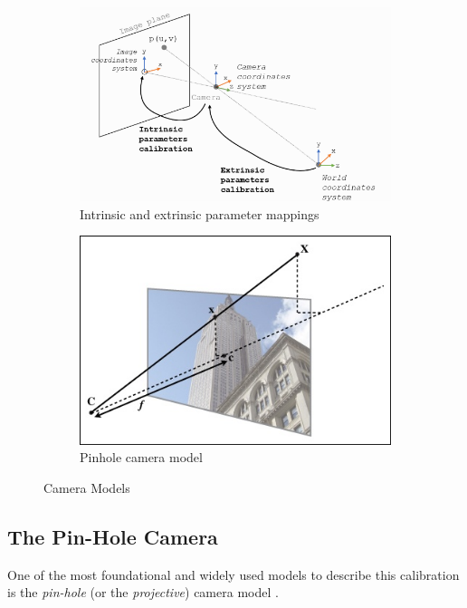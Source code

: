 \begin{figure}[h]
  \centering
  \begin{subfigure}{0.45\linewidth}
    \centering
    \includegraphics[width=\linewidth]{assets/background/in-extrinsic.png}
    \caption{Intrinsic and extrinsic parameter mappings \cite{mphy0026camera}}\label{fig:in-extrinsic}
  \end{subfigure}
  \hfill
  \begin{subfigure}{0.45\linewidth}
    \centering
    \includegraphics[width=\linewidth]{assets/background/pinhole-cam.jpg}
    \caption{Pinhole camera model \cite{solem2012programming}}\label{fig:pinhole}
  \end{subfigure}
  \caption{Camera Models}\label{fig:cam-models}
\end{figure}

\subsection {The Pin-Hole Camera}
One of the most foundational and widely used models to describe this calibration is the \emph{pin-hole} (or the  \emph{projective}) camera model \cite{solem2012programming}. 

